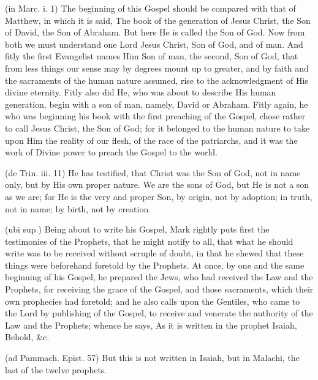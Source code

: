  (in Marc. i. 1) The beginning of this Gospel should be compared with that of Matthew, in which it is said, The book of the generation of Jesus Christ, the Son of David, the Son of Abraham. But here He is called the Son of God. Now from both we must understand one Lord Jesus Christ, Son of God, and of man. And fitly the first Evangelist names Him Son of man, the second, Son of God, that from less things our sense may by degrees mount up to greater, and by faith and the sacraments of the human nature assumed, rise to the acknowledgment of His divine eternity. Fitly also did He, who was about to describe His human generation, begin with a son of man, namely, David or Abraham. Fitly again, he who was beginning his book with the first preaching of the Gospel, chose rather to call Jesus Christ, the Son of God; for it belonged to the human nature to take upon Him the reality of our flesh, of the race of the patriarchs, and it was the work of Divine power to preach the Gospel to the world.

 (de Trin. iii. 11) He has testified, that Christ was the Son of God, not in name only, but by His own proper nature. We are the sons of God, but He is not a son as we are; for He is the very and proper Son, by origin, not by adoption; in truth, not in name; by birth, not by creation.

 

 (ubi sup.) Being about to write his Gospel, Mark rightly puts first the testimonies of the Prophets, that he might notify to all, that what he should write was to be received without scruple of doubt, in that he shewed that these things were beforehand foretold by the Prophets. At once, by one and the same beginning of his Gospel, he prepared the Jews, who had received the Law and the Prophets, for receiving the grace of the Gospel, and those sacraments, which their own prophecies had foretold; and he also calls upon the Gentiles, who came to the Lord by publishing of the Gospel, to receive and venerate the authority of the Law and the Prophets; whence he says, As it is written in the prophet Isaiah, Behold, \&c.

 (ad Pammach. Epist. 57) But this is not written in Isaiah, but in Malachi, the last of the twelve prophets.

